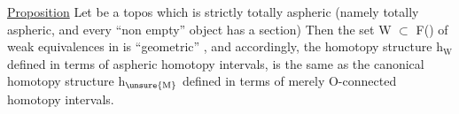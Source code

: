 \uline{Proposition}  Let  be a topos which is strictly totally aspheric
(namely totally aspheric,  and every ``non empty'' object has a section)\hand{:}
 Then the set W $\subset$ F()  of weak equivalences in  is ``geometric'' ,  and
accordingly,  the homotopy structure h$_{\mathrm{W}}$  defined in terms of aspheric
homotopy intervals,  is the same as the canonical homotopy structure h$_{\unsure{\mathrm{M}}}$
defined in terms of merely O-connected homotopy intervals.  

